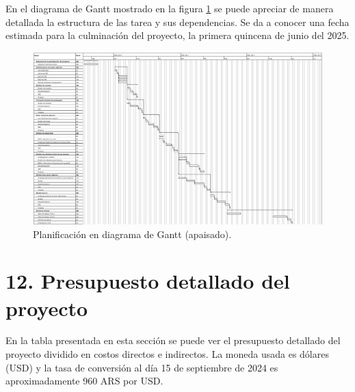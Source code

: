 \documentclass[
11pt, %
]{charter}
\begin{document}
En el diagrama de Gantt mostrado en la figura \ref{fig:diagGantt} se puede apreciar de manera detallada la estructura de las tarea y sus dependencias. Se da a conocer una fecha estimada para la culminación del proyecto, la primera quincena de junio del 2025. 

\begin{landscape}
\begin{figure}[htpb]
\centering 
\includegraphics[height=.85\textheight]{./Figuras/Gdp-Gantt.png}
\caption{Planificación en diagrama de Gantt (apaisado).} %
\label{fig:diagGantt}
\end{figure}

\end{landscape}

\section{12. Presupuesto detallado del proyecto}
\label{sec:presupuesto}

En la tabla presentada en esta sección se puede ver el presupuesto detallado del proyecto dividido en costos directos e indirectos. La moneda usada es dólares (USD) y la tasa de conversión al día 15 de septiembre de 2024 es aproximadamente 960 ARS por USD.
\end{document}
